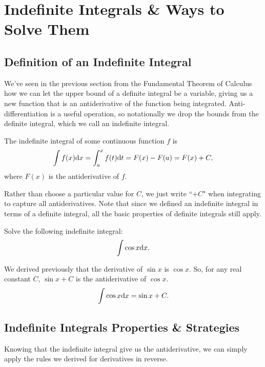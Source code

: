 \section{Indefinite Integrals \& Ways to Solve Them}

\subsection{Definition of an Indefinite Integral}
We've seen in the previous section from the Fundamental Theorem of Calculus how we can let the upper bound of a definite integral be a variable, giving us a new function that is an antiderivative of the function being integrated.
Anti-differentiation is a useful operation, so notationally we drop the bounds from the definite integral, which we call an indefinite integral.
\begin{definition}
	The indefinite integral of some continuous function $f$ is
	\begin{equation*}
		\int{f(x)\mathrm{d} x} = \int_{a}^{x}{f(t)\mathrm{d} t} = F(x) - F(a) = F(x) + C,
	\end{equation*}
	where $F(x)$ is the antiderivative of $f$.
\end{definition}

Rather than choose a particular value for $C$, we just write ``$+C$" when integrating to capture all antiderivatives.
Note that since we defined an indefinite integral in terms of a definite integral, all the basic properties of definite integrals still apply.

\begin{example}
	Solve the following indefinite integral:
	\begin{equation*}
		\int{\cos{x}\mathrm{d} x}.
	\end{equation*}
\end{example}
\begin{answer}
	We derived previously that the derivative of $\sin{x}$ is $\cos{x}$.
	So, for any real constant $C$, $\sin{x} + C$ is the antiderivative of $\cos{x}$.
	\begin{equation*}
		\int{\cos{x}\mathrm{d} x} = \sin{x} + C.
	\end{equation*}
\end{answer}

\subsection{Indefinite Integrals Properties \& Strategies}
Knowing that the indefinite integral give us the antiderivative, we can simply apply the rules we derived for derivatives in reverse.

